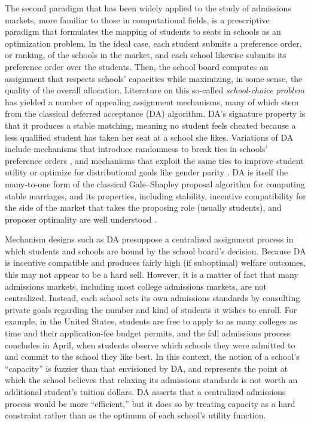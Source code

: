 \documentclass[12pt]{article}
\theoremstyle{definition}
\begin{document}
The second paradigm that has been widely applied to the study of admissions markets, more familiar to those in computational fields, is a prescriptive paradigm that formulates the mapping of students to seats in schools as an optimization problem. In the ideal case, each student submits a preference order, or ranking, of the schools in the market, and each school likewise submits its preference order over the students. Then, the school board computes an assignment that respects schools' capacities while maximizing, in some sense, the quality of the overall allocation. Literature on this so-called \emph{school-choice problem} has yielded a number of appealing assignment mechanisms, many of which stem from the classical deferred acceptance (DA) algorithm. DA's signature property is that it produces a stable matching, meaning no student feels cheated because a less qualified student has taken her seat at a school she likes. Variations of DA include mechanisms that introduce randomness to break ties in schools' preference orders \parencite[][]{whatmatters}, and mechanisms that exploit the same ties to improve student utility \parencite[][]{expandingchoice} or optimize for distributional goals like gender parity \parencite[][]{distributionalgoals}. DA is itself the many-to-one form of the classical Gale--Shapley proposal algorithm for computing stable marriages, and its properties, including stability, incentive compatibility for the side of the market that takes the proposing role (usually students), and proposer optimality are well understood \parencite[][]{galeshapley1962, economicsofmatching}.

Mechanism designs such as DA presuppose a centralized assignment process in which students and schools are bound by the school board's decision. Because DA is incentive compatible and produces fairly high (if suboptimal) welfare outcomes, this may not appear to be a hard sell. However, it is a matter of fact that many admissions markets, including most college admissions markets, are not centralized. Instead, each school sets its own admissions standards by consulting private goals regarding the number and kind of students it wishes to enroll. For example, in the United States, students are free to apply to as many colleges as time and their application-fee budget permits, and the fall admissions process concludes in April, when students observe which schools they were admitted to and commit to the school they like best. In this context, the notion of a school's ``capacity'' is fuzzier than that envisioned by DA, and represents the point at which the school believes that relaxing its admissions standards is not worth an additional student's tuition dollars. DA asserts that a centralized admissions process would be more ``efficient,'' but it does so by treating capacity as a hard constraint rather than as the optimum of each school's utility function. 
\end{document}
